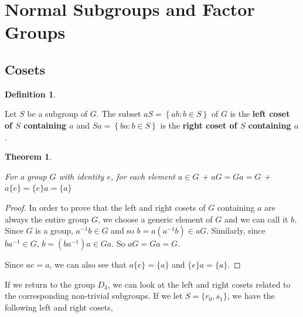 \documentclass[
]{book}
\newtheorem{theorem}{Theorem}[chapter]
\theoremstyle{definition}
\newtheorem{definition}{Definition}[chapter]
\theoremstyle{definition}
\theoremstyle{definition}
\theoremstyle{definition}
\theoremstyle{remark}
\begin{document}
\hypertarget{normal-subgroups-and-factor-groups}{%
\section{Normal Subgroups and Factor Groups}\label{normal-subgroups-and-factor-groups}}

\hypertarget{cosets}{%
\subsection{Cosets}\label{cosets}}

\begin{definition}
\protect\hypertarget{def:unlabeled-div-217}{}\label{def:unlabeled-div-217}

Let \(S\) be a subgroup of \(G\). The subset \(aS = \left\{ a b: b\in S \right\}\) of \(G\) is the \textbf{left coset of \(S\) containing \(a\)} and \(Sa = \left\{ ba : b\in S \right\}\) is the \textbf{right coset of \(S\) containing \(a\)}.

\end{definition}

\begin{theorem}
\protect\hypertarget{thm:unlabeled-div-218}{}\label{thm:unlabeled-div-218}

For a group \(G\) with identity \(e\), for each element \(a\in G\)
+ \(aG=Ga=G\)
+ \(a\{e\}=\{e\} a=\{a\}\)

\end{theorem}

\begin{proof}

In order to prove that the left and right cosets of \(G\) containing \(a\) are always the entire group \(G\), we choose a generic element of \(G\) and we can call it \(b\). Since \(G\) is a group, \(a^{-1}b\in G\) and so \(b= a (a^{-1}b) \in aG\). Similarly, since \(ba^{-1}\in G\), \(b = (ba^{-1})a \in Ga\). So \(aG=Ga=G\).

Since \(ae=a\), we can also see that \(a\{e\} = \{a\}\) and \(\{e\}a=\{a\}\).

\end{proof}

If we return to the group \(D_3\), we can look at the left and right cosets related to the corresponding non-trivial subgroups. If we let \(S=\{r_0,s_1\}\), we have the following left and right cosets,
\end{document}
